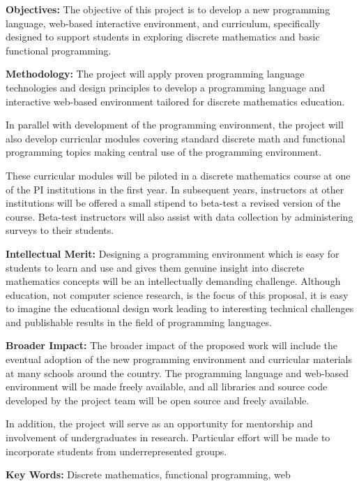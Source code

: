 {\bf Objectives: } The objective of this project is to develop a new
programming language, web-based interactive environment, and
curriculum, specifically designed to support students in exploring
discrete mathematics and basic functional programming.

{\bf Methodology: } The project will apply proven programming language
technologies and design principles to develop a programming language
and interactive web-based environment tailored for discrete
mathematics education.

In parallel with development of the programming environment, the
project will also develop curricular modules covering standard
discrete math and functional programming topics making central use of
the programming environment.

These curricular modules will be piloted in a discrete mathematics
course at one of the PI institutions in the first year.  In subsequent
years, instructors at other institutions will be offered a small
stipend to beta-test a revised version of the course.  Beta-test
instructors will also assist with data collection by administering
surveys to their students.

{\bf Intellectual Merit:} Designing a programming environment
which is easy for students to learn and use and gives them genuine
insight into discrete mathematics concepts will be an intellectually
demanding challenge.  Although education, not computer science
research, is the focus of this proposal, it is easy to imagine the
educational design work leading to interesting technical challenges
and publishable results in the field of programming languages.

{\bf Broader Impact: } The broader impact of the proposed work will
include the eventual adoption of the new programming environment and
curricular materials at many schools around the country.  The
programming language and web-based environment will be made freely
available, and all libraries and source code developed by the project
team will be open source and freely available.

In addition, the project will serve as an opportunity for mentorship
and involvement of undergraduates in research.  Particular effort will
be made to incorporate students from underrepresented groups.

{\bf Key Words:} Discrete mathematics, functional programming, web


